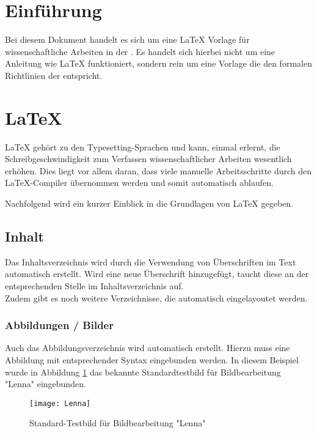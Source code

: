 \section{Einführung}
\label{sec:einfuehrung}

Bei diesem Dokument handelt es sich um eine \LaTeX{} Vorlage für wissenschaftliche Arbeiten in der . Es handelt sich hierbei nicht um eine Anleitung wie \LaTeX{} funktioniert, sondern rein um eine Vorlage die den formalen Richtlinien der  entspricht.

\newpage
\section{\LaTeX}

\LaTeX{} gehört zu den Typesetting-Sprachen und kann, einmal erlernt, die Schreibgeschwindigkeit
zum Verfassen wissenschaftlicher Arbeiten wesentlich erhöhen. Dies liegt vor allem daran, dass viele
manuelle Arbeitsschritte durch den \LaTeX{}-Compiler übernommen werden und somit automatisch ablaufen.

Nachfolgend wird ein kurzer Einblick in die Grundlagen von \LaTeX{} gegeben.

\subsection{Inhalt}

Das Inhaltsverzeichnis wird durch die Verwendung von Überschriften im Text automatisch erstellt.
Wird eine neue Überschrift hinzugefügt, taucht diese an der entsprechenden Stelle im Inhaltsverzeichnis auf.\\

Zudem gibt es noch weitere Verzeichnisse, die automatisch eingelayoutet werden.

\subsubsection{Abbildungen / Bilder}

Auch das Abbildungsverzeichnis wird automatisch erstellt. Hierzu muss eine Abbildung mit
entsprechender Syntax eingebunden werden. In diesem Beispiel wurde in Abbildung
\ref{fig: Lenna} das bekannte Standardtestbild für Bildbearbeitung "Lenna" eingebunden.

\begin{figure}[H]
  \centering
  \texttt{[image: Lenna]}
  \caption{Standard-Testbild für Bildbearbeitung "Lenna"}
  \label{fig: Lenna}
\end{figure}

